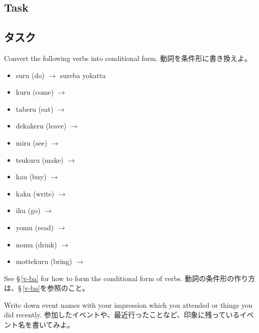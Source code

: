 \documentclass[uplatex,dvipdfmx,b5paper,english,10pt]{jsbook}
\begin{document}
\ifEnglish
\subsection{Task}
\else
\subsection{タスク}
\fi

\begin{toiquestion}
\ifEnglish
Convert the following verbs into conditional form.
\else
動詞を条件形に書き換えよ。
\fi
\end{toiquestion}

\begin{multicols}{2}
 \begin{itemize}
 \setcounter{enumi}{-1}
 \item suru (do) $\rightarrow$ sureba yokatta \hrulefill
 \item kuru (come)   $\rightarrow$ \hrulefill
 \item taberu (eat)   $\rightarrow$ \hrulefill
 \item dekakeru (leave) $\rightarrow$ \hrulefill
 \item miru (see)  $\rightarrow$ \hrulefill
 \item tsukuru (make) $\rightarrow$ \hrulefill
 \item kau (buy)   $\rightarrow$ \hrulefill
 \item kaku (write)  $\rightarrow$ \hrulefill
 \item iku (go)   $\rightarrow$ \hrulefill
 \item yomu (read)   $\rightarrow$ \hrulefill
 \item nomu (drink)   $\rightarrow$ \hrulefill
 \item mottekuru (bring)   $\rightarrow$ \hrulefill
 \end{itemize}
\end{multicols}

\begin{toianswer}
\ifEnglish
See \S\,\ref{v-ba} for how to form the conditional form of verbs.
\else
動詞の条件形の作り方は、\S\,\ref{v-ba}を参照のこと。
\fi
\end{toianswer}

\begin{toiquestion}
\ifEnglish
Write down event names with your impression which you attended or things you did recently.
\else
参加したイベントや、最近行ったことなど、印象に残っているイベント名を書いてみよ。
\fi
\end{toiquestion}
\end{document}
